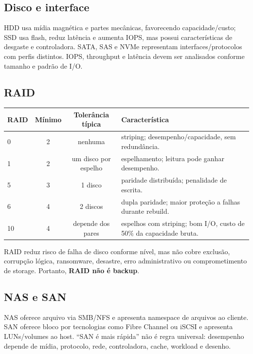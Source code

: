 \subsection{Disco e interface}

HDD usa mídia magnética e partes mecânicas, favorecendo capacidade/custo; SSD usa flash, reduz latência e aumenta IOPS, mas possui características de desgaste e controladora. SATA, SAS e NVMe representam interfaces/protocolos com perfis distintos. IOPS, throughput e latência devem ser analisados conforme tamanho e padrão de I/O.

\subsection{RAID}

\begin{table}[ht]
\centering
\small
\begin{tabularx}{\textwidth}{l c c X}
\toprule
RAID & Mínimo & Tolerância típica & Característica \\
\midrule
0 & 2 & nenhuma & striping; desempenho/capacidade, sem redundância. \\
1 & 2 & um disco por espelho & espelhamento; leitura pode ganhar desempenho. \\
5 & 3 & 1 disco & paridade distribuída; penalidade de escrita. \\
6 & 4 & 2 discos & dupla paridade; maior proteção a falhas durante rebuild. \\
10 & 4 & depende dos pares & espelhos com striping; bom I/O, custo de 50\% da capacidade bruta. \\
\bottomrule
\end{tabularx}
\end{table}

RAID reduz risco de falha de disco conforme nível, mas não cobre exclusão, corrupção lógica, ransomware, desastre, erro administrativo ou comprometimento de storage. Portanto, \textbf{RAID não é backup}.

\subsection{NAS e SAN}

NAS oferece arquivo via SMB/NFS e apresenta namespace de arquivos ao cliente. SAN oferece bloco por tecnologias como Fibre Channel ou iSCSI e apresenta LUNs/volumes ao host. ``SAN é mais rápida'' não é regra universal: desempenho depende de mídia, protocolo, rede, controladora, cache, workload e desenho.

